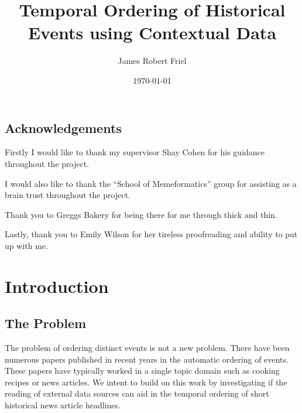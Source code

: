 \documentclass[bsc,frontabs,twoside,singlespacing,parskip,deptreport]{infthesis}     %
\begin{document}
\title{Temporal Ordering of Historical Events using Contextual Data}

\author{James Robert Friel}
 

\date{\today}

\abstract{}


\maketitle

\section*{Acknowledgements}
Firstly I would like to thank my supervisor Shay Cohen for his guidance throughout the project.

I would also like to thank the ``School of Memeformatics'' group for assisting as a brain trust
throughout the project.

Thank you to Greggs Bakery for being there for me through thick and thin.

Lastly, thank you to Emily Wilson for her tireless proofreading and ability to put up with me.

\tableofcontents



\chapter{Introduction}
\section{The Problem}
The problem of ordering distinct events is not a new problem. There have been numerous papers published
in recent years in the automatic ordering of events. These papers have typically worked in a single
topic domain such as cooking recipes or news articles. We intent to build on this work by
investigating if the reading of external data sources can aid in the temporal ordering of short
historical news article headlines.
\end{document}
